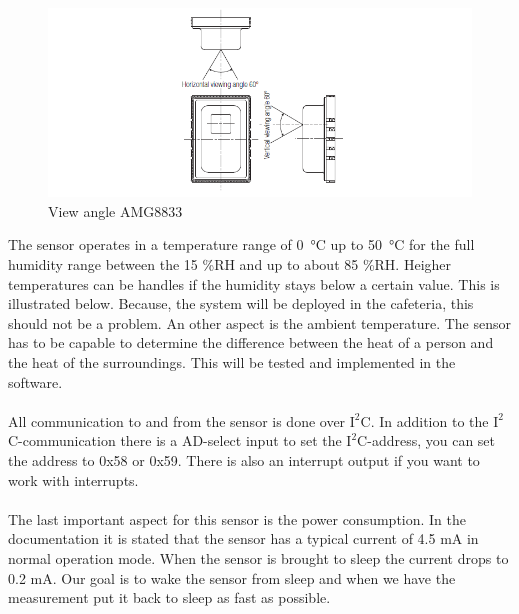 \documentclass[11pt,a4paper]{article}
\begin{document}
\begin{figure}[H]
	\centering
	\includegraphics[width=0.8\linewidth]{view angle AMG8833.png}
	\caption{View angle AMG8833}
	\label{fig:angleview}
\end{figure}
The sensor operates in a temperature range of \SI{0}{\celsius} up to \SI{50}{\celsius} for the full humidity range between the 15 \%RH and up to about 85 \%RH. Heigher temperatures can be handles if the humidity stays below a certain value. This is illustrated below. Because, the system will be deployed in the cafeteria, this should not be a problem. An other aspect is the ambient temperature. The sensor has to be capable to determine the difference between the heat of a person and the heat of the surroundings. This will be tested and implemented in the software. 
\\ \\
All communication to and from the sensor is done over $\text{I}^2$C. In addition to the $\text{I}^2$C-communication there is a AD-select input to set the $\text{I}^2$C-address, you can set the address to 0x58 or 0x59. There is also an interrupt output if you want to work with interrupts.
\\ \\
The last important aspect for this sensor is the power consumption. In the documentation it is stated that the sensor has a typical current of 4.5 mA in normal operation mode. When the sensor is brought to sleep the current drops to 0.2 mA. Our goal is to wake the sensor from sleep and when we have the measurement put it back to sleep as fast as possible.
\end{document}
